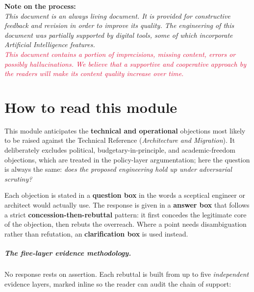 \documentclass[11pt,a4paper,twoside]{book}
\newcommand{\keyword}[1]{\textbf{#1}}
\newcommand{\trref}[1]{the Technical Reference (\emph{#1})}
\begin{document}
\begin{titlepage}
\vspace{0.6cm}

\begin{minipage}{0.85\textwidth}
\small\noindent\textbf{Note on the process:}\\
\textit{This document is an always living document. It is provided for
constructive feedback and revision in order to improve its quality. The
engineering of this document was partially supported by digital tools, some
of which incorporate Artificial Intelligence features.}\\[3pt]
\textcolor{Crimson}{\textit{This document contains a portion of imprecisions,
missing content, errors or possibly hallucinations. We believe that a
supportive and cooperative approach by the readers will make its content
quality increase over time.}}
\end{minipage}

\vspace{1.5cm}
\end{titlepage}

\frontmatter
\hypersetup{pageanchor=true}

\chapter*{How to read this module}

This module anticipates the \keyword{technical and operational}
objections most likely to be raised against \trref{Architecture and
Migration}. It deliberately excludes political, budgetary-in-principle,
and academic-freedom objections, which are treated in the policy-layer
argumentation; here the question is always the same: \emph{does the
proposed engineering hold up under adversarial scrutiny?}

Each objection is stated in a \textcolor{red!60!black}{\textbf{question
box}} in the words a sceptical engineer or architect would actually use.
The response is given in a \textcolor{OliveGreen!60!black}{\textbf{answer
box}} that follows a strict \keyword{concession-then-rebuttal} pattern:
it first concedes the legitimate core of the objection, then rebuts the
overreach. Where a point needs disambiguation rather than refutation, an
\textcolor{orange!60!black}{\textbf{clarification box}} is used instead.

\paragraph{The five-layer evidence methodology.}
No response rests on assertion. Each rebuttal is built from up to five
\emph{independent} evidence layers, marked inline so the reader can audit
the chain of support:
\end{document}
